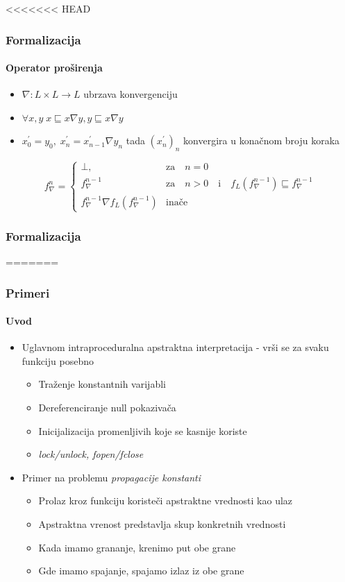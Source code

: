\documentclass[xetex,mathserif,serif]{beamer}
\begin{document}
  \begin{frame}
<<<<<<< HEAD
    \frametitle{Formalizacija}
    \framesubtitle{Operator proširenja}
    \begin{center}
    	\begin{itemize}
    		\item $\nabla : L \times L \rightarrow L$ ubrzava konvergenciju \pause
    		\item $\forall x,\! y \; x \sqsubseteq x \nabla y, y \sqsubseteq x \nabla y$ \pause
    		\item $x^{\prime}_{0} = y_{0}, \; x^{\prime}_{n} = x^{\prime}_{n-1} \nabla y_{n}$ tada $(x^{\prime}_{n})_{n}$ konvergira u konačnom broju koraka \pause
    	\end{itemize}
    	$$
			f^{n}_{\nabla} = 
			\begin{cases}
			\bot,            								  
				& 	\text{za} \quad n = 0 \\
			f^{n-1}_{\nabla} 							      
				& \text{za} \quad n > 0 \quad \text{i} \quad f_{L}(f^{n-1}_{\nabla}) \sqsubseteq f^{n-1}_{\nabla} \\
			f^{n-1}_{\nabla} \nabla f_{L}(f^{n-1}_{\nabla})  
				& \text{inače}
			\end{cases}
		$$
	\end{center}
  \end{frame}
  \begin{frame}
    \frametitle{Formalizacija}
=======
    \frametitle{Primeri}
    \framesubtitle{Uvod}
    \begin{center}
		\begin{itemize}
			\item Uglavnom intraproceduralna apstraktna interpretacija - vr\v si se za svaku funkciju posebno
			\begin{itemize}
				\item Tra\v zenje konstantnih varijabli
				\item Dereferenciranje null pokaziva\v ca
				\item Inicijalizacija promenljivih koje se kasnije koriste
				\item \emph{lock/unlock, fopen/fclose}
			\end{itemize}
			\item Primer na problemu \emph{propagacije konstanti}
			\begin{itemize}
				\item Prolaz kroz funkciju koriste\v ci apstraktne vrednosti kao ulaz 
				\item Apstraktna vrenost predstavlja skup konkretnih vrednosti
				\item Kada imamo grananje, krenimo put obe grane
				\item Gde imamo spajanje, spajamo izlaz iz obe grane
			\end{itemize}
		\end{itemize}
	\end{center}
  \end{frame}
\end{document}
